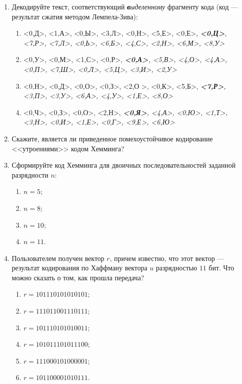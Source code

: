 \begin{enumerate}
    \item Декодируйте текст, соответствующий \emph{\textbf{в}ыделенному} фрагменту кода (код --- результат сжатия методом Лемпела-Зива):
    \begin{enumerate}
        \item 
            <0,Д>, <1,А>, <0,Ы>, <3,Л>, 
            <0,Н>, <5,Е>, <0,Е>, \emph{\textbf{<0,Ц>}, 
            <7,Р>, <7,Л>, <0,Ь>, <6,Б>, 
            <4,С>, <2,Н>, <6,М>, <8,У>} 
        \item 
            <0,У>, <0,М>, <1,С>, <0,Р>,
            \emph{\textbf{<0,А>}, <5,В>, <4,О>, <4,А>, 
            <0,П>, <7,Ш>, <0,Л>, <5,Ц>, 
            <3,И>, <2,У>}
        \item 
           <0,Н>, <0,Д>, <0,О>, <0,З>, 
           <2,О >, <0,К>, <5,Б>, \emph{\textbf{<7,Р>}, 
           <3,П>, <3,У>, <6,А>, <4,У>, <1,Е>, <8,О>}
           
        \item 
            <0,Ч>, <0,З>, <0,О>, <2,Н>, 
            \emph{\textbf{<0,Я>}, <4,А>, <0,Ю>, <1,Т>, 
            <3,Н>, <0,И>, <1,Е>, <0,Г>, <9,Е>, <6,Ю>}
           
    \end{enumerate}

    \item Скажите, является ли приведенное помехоустойчивое кодирование <<утроениями>> кодом Хемминга?
    
    \item Сформируйте код Хемминга для двоичных последовательностей заданной разрядности $n$:
    \begin{enumerate}
        \item $n=5$;
        \item $n=8$;
        \item $n=10$;
        \item $n=11$.
    \end{enumerate}
    
    \item Пользователем получен вектор $r$, причем известно, что этот вектор --- результат кодирования по Хаффману вектора $u$ разрядностью $11$ бит. Что можно сказать о том, как прошла передача?
    \begin{enumerate}
        \item $r=101110101010101$;
        \item $r=111011001110111$;
        \item $r=101110101010011$;
        \item $r=101011101011100$;
        \item $r=111000101000001$;
        \item $r=101100001010111$.
    \end{enumerate}
    

\end{enumerate}
